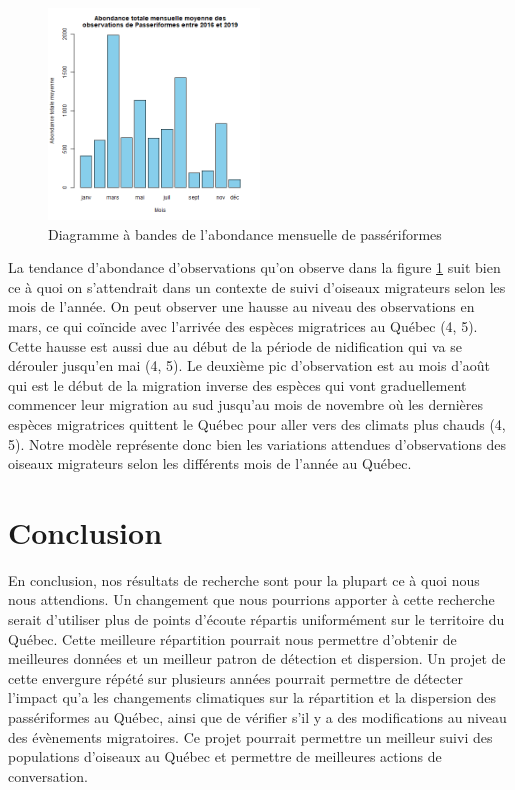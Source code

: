 \documentclass[9pt,twocolumn,twoside,]{pnas-new}
\begin{document}
\begin{figure}
\centering
\includegraphics[width=0.5\textwidth,height=0.4\textheight]{Figure4.png}
\caption{Diagramme à bandes de l'abondance mensuelle de passériformes
\label{fig:plot3}}
\end{figure}

La tendance d'abondance d'observations qu'on observe dans la figure
\ref{fig:plot3} suit bien ce à quoi on s'attendrait dans un contexte de
suivi d'oiseaux migrateurs selon les mois de l'année. On peut observer
une hausse au niveau des observations en mars, ce qui coïncide avec
l'arrivée des espèces migratrices au Québec (4, 5). Cette hausse est
aussi due au début de la période de nidification qui va se dérouler
jusqu'en mai (4, 5). Le deuxième pic d'observation est au mois d'août
qui est le début de la migration inverse des espèces qui vont
graduellement commencer leur migration au sud jusqu'au mois de novembre
où les dernières espèces migratrices quittent le Québec pour aller vers
des climats plus chauds (4, 5). Notre modèle représente donc bien les
variations attendues d'observations des oiseaux migrateurs selon les
différents mois de l'année au Québec.

\hypertarget{conclusion}{%
\section*{Conclusion}\label{conclusion}}

En conclusion, nos résultats de recherche sont pour la plupart ce à quoi
nous nous attendions. Un changement que nous pourrions apporter à cette
recherche serait d'utiliser plus de points d'écoute répartis
uniformément sur le territoire du Québec. Cette meilleure répartition
pourrait nous permettre d'obtenir de meilleures données et un meilleur
patron de détection et dispersion. Un projet de cette envergure répété
sur plusieurs années pourrait permettre de détecter l'impact qu'a les
changements climatiques sur la répartition et la dispersion des
passériformes au Québec, ainsi que de vérifier s'il y a des
modifications au niveau des évènements migratoires. Ce projet pourrait
permettre un meilleur suivi des populations d'oiseaux au Québec et
permettre de meilleures actions de conversation.
\end{document}
